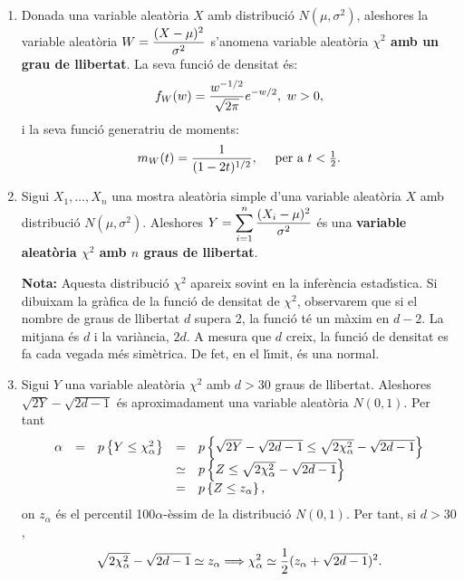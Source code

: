 \begin{enumerate}
\item Donada una variable aleat\`oria $X$ amb distribuci\'o $N(\mu,\sigma^2)$,
aleshores la variable aleat\`oria $\displaystyle W = {(X-\mu)^2 \over \sigma^2}$
s'anomena variable aleat\`oria {\bf $\chi^2$ amb un grau de llibertat}. La seva
funci\'o de densitat \'es:
$$f_W(w) = {w^{-1/2} \over \sqrt{2 \pi}} e^{-w/2}, \ w > 0,$$
i la seva funci\'o generatriu de moments:
$$m_W(t) = {1 \over (1-2t)^{1/2}},\quad\mbox{ per a $t<\frac{1}{2}$.}$$

\item Sigui $X_1, \ldots , X_n$ una mostra aleat\`oria simple d'una variable
aleat\`oria $X$ amb distribuci\'o $N(\mu,\sigma^2)$. Aleshores $\displaystyle
Y = \sum_{i=1}^n {(X_i-\mu)^2 \over \sigma^2}$ \'es una {\bf variable aleat\`oria 
$\chi^2$ amb $n$ graus de llibertat}.

{\bf Nota:} Aquesta distribuci\'o $\chi^2$ apareix sovint en la infer\`encia
estad\'{\i}stica.
Si dibuixam la gr\`afica de la funci\'o de densitat
 de $\chi^2$,
observarem que si el nombre de graus de llibertat
 $d$ supera 2, la funci\'o t\'e un
m\`axim en $d-2$. La mitjana \'es $d$ i la vari\`ancia, 
 $2d$. A mesura que $d$ creix, la
funci\'o de densitat es fa cada vegada m\'es sim\`etrica.
 De fet, 
en el l\'{\i}mit, \'es una normal.

\item Sigui $Y$ una variable aleat\`oria $\chi^2$ amb $d > 30$ graus de llibertat.
Aleshores $\sqrt{2Y} - \sqrt{2d-1}$ \'es aproximadament una variable aleat\`oria
$N(0,1)$. Per tant
$$
\begin{array}{lllll}
\alpha & = & p\left\{Y \leq \chi_\alpha^2\right\}  & = & p\left\{\sqrt{2Y} -
\sqrt{2d-1} \leq \sqrt{2\chi_\alpha^2} - \sqrt{2d-1}\right\}\\
& &  & \simeq  & p\left\{Z \leq \sqrt{2\chi_\alpha^2} - \sqrt{2d-1}\right\} \\
& &  & =  & p\left\{Z \leq z_\alpha\right\},
\end{array}
$$
on $z_\alpha$ \'es el percentil 100$\alpha$-\`essim de 
la distribuci\'o $N(0,1)$. Per tant, si $d > 30$,
$$\sqrt{2\chi_\alpha^2} - \sqrt{2d-1} \simeq z_\alpha \Longrightarrow
\chi_\alpha^2 \simeq {1 \over 2} (z_\alpha + \sqrt{2d-1})^2.$$


\end{enumerate}
